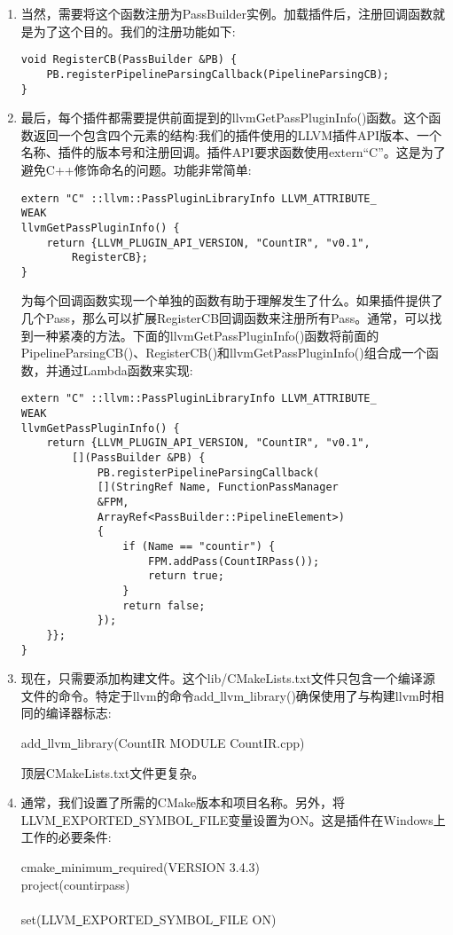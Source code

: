 \begin{enumerate}
\item 当然，需要将这个函数注册为PassBuilder实例。加载插件后，注册回调函数就是为了这个目的。我们的注册功能如下:
\begin{lstlisting}[caption={}]
void RegisterCB(PassBuilder &PB) {
	PB.registerPipelineParsingCallback(PipelineParsingCB);
}
\end{lstlisting}
	
\item 最后，每个插件都需要提供前面提到的llvmGetPassPluginInfo()函数。这个函数返回一个包含四个元素的结构:我们的插件使用的LLVM插件API版本、一个名称、插件的版本号和注册回调。插件API要求函数使用extern“C”。这是为了避免C++修饰命名的问题。功能非常简单:
\begin{lstlisting}[caption={}]
extern "C" ::llvm::PassPluginLibraryInfo LLVM_ATTRIBUTE_
WEAK
llvmGetPassPluginInfo() {
	return {LLVM_PLUGIN_API_VERSION, "CountIR", "v0.1",
		RegisterCB};
}
\end{lstlisting}
为每个回调函数实现一个单独的函数有助于理解发生了什么。如果插件提供了几个Pass，那么可以扩展RegisterCB回调函数来注册所有Pass。通常，可以找到一种紧凑的方法。下面的llvmGetPassPluginInfo()函数将前面的PipelineParsingCB()、RegisterCB()和llvmGetPass\allowbreak PluginInfo()组合成一个函数，并通过Lambda函数来实现:
\begin{lstlisting}[caption={}]
extern "C" ::llvm::PassPluginLibraryInfo LLVM_ATTRIBUTE_
WEAK
llvmGetPassPluginInfo() {
	return {LLVM_PLUGIN_API_VERSION, "CountIR", "v0.1",
		[](PassBuilder &PB) {
			PB.registerPipelineParsingCallback(
			[](StringRef Name, FunctionPassManager 
			&FPM,
			ArrayRef<PassBuilder::PipelineElement>) 
			{
				if (Name == "countir") {
					FPM.addPass(CountIRPass());
					return true;
				}
				return false;
			});
	}};
}
\end{lstlisting}
	
\item 现在，只需要添加构建文件。这个lib/CMakeLists.txt文件只包含一个编译源文件的命令。特定于llvm的命令add\underline{~}llvm\underline{~}library()确保使用了与构建llvm时相同的编译器标志:
\begin{tcolorbox}[colback=white,colframe=black]
add\underline{~}llvm\underline{~}library(CountIR MODULE CountIR.cpp)
\end{tcolorbox}
顶层CMakeLists.txt文件更复杂。
	
\item 通常，我们设置了所需的CMake版本和项目名称。另外，将LLVM\underline{~}EXPORTED\underline{~}SYMBOL\underline{~}FILE变量设置为ON。这是插件在Windows上工作的必要条件:
\begin{tcolorbox}[colback=white,colframe=black]
cmake\underline{~}minimum\underline{~}required(VERSION 3.4.3) \\
project(countirpass)\\
\\
set(LLVM\underline{~}EXPORTED\underline{~}SYMBOL\underline{~}FILE ON)
\end{tcolorbox}
	

\end{enumerate}
